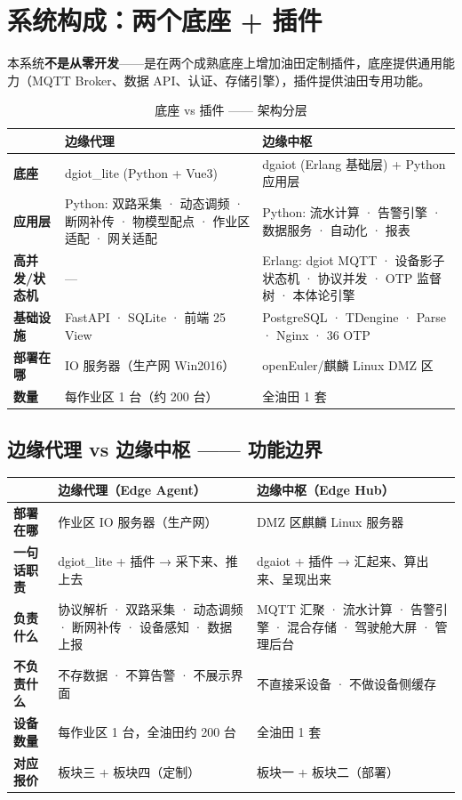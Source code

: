 \documentclass[11pt,a4paper]{ctexart}
\begin{document}
\section{系统构成：两个底座 + 插件}

本系统\textbf{不是从零开发}——是在两个成熟底座上增加油田定制插件，底座提供通用能力（MQTT Broker、数据 API、认证、存储引擎），插件提供油田专用功能。

\begin{table}[H]\centering
\caption{底座 vs 插件 —— 架构分层}
\begin{tabular}{p{3.2cm} p{5.0cm} p{5.0cm}}
\toprule
 & \textbf{边缘代理} & \textbf{边缘中枢} \\
\midrule
\textbf{底座} & dgiot\_lite (Python + Vue3) & dgaiot (Erlang 基础层) + Python 应用层 \\
\textbf{应用层} & Python: 双路采集 · 动态调频 · 断网补传 · 物模型配点 · 作业区适配 · 网关适配 & Python: 流水计算 · 告警引擎 · 数据服务 · 自动化 · 报表 \\
\textbf{高并发/状态机} & — & Erlang: dgiot MQTT · 设备影子状态机 · 协议并发 · OTP 监督树 · 本体论引擎 \\
\textbf{基础设施} & FastAPI · SQLite · 前端 25 View & PostgreSQL · TDengine · Parse · Nginx · 36 OTP \\
\textbf{部署在哪} & IO 服务器（生产网 Win2016） & openEuler/麒麟 Linux DMZ 区 \\
\textbf{数量} & 每作业区 1 台（约 200 台） & 全油田 1 套 \\
\bottomrule
\end{tabular}
\end{table}



\subsection{边缘代理 vs 边缘中枢 —— 功能边界}

\begin{table}[H]\centering
\begin{tabular}{p{3.8cm} p{5.2cm} p{5.2cm}}
\toprule
 & \textbf{边缘代理（Edge Agent）} & \textbf{边缘中枢（Edge Hub）} \\
\midrule
\textbf{部署在哪} & 作业区 IO 服务器（生产网） & DMZ 区麒麟 Linux 服务器 \\
\textbf{一句话职责} & dgiot\_lite + 插件 → 采下来、推上去 & dgaiot + 插件 → 汇起来、算出来、呈现出来 \\
\textbf{负责什么} & 协议解析 · 双路采集 · 动态调频 · 断网补传 · 设备感知 · 数据上报 & MQTT 汇聚 · 流水计算 · 告警引擎 · 混合存储 · 驾驶舱大屏 · 管理后台 \\
\textbf{不负责什么} & 不存数据 · 不算告警 · 不展示界面 & 不直接采设备 · 不做设备侧缓存 \\
\textbf{设备数量} & 每作业区 1 台，全油田约 200 台 & 全油田 1 套 \\
\textbf{对应报价} & 板块三 + 板块四（定制） & 板块一 + 板块二（部署） \\
\bottomrule
\end{tabular}
\end{table}
\end{document}
